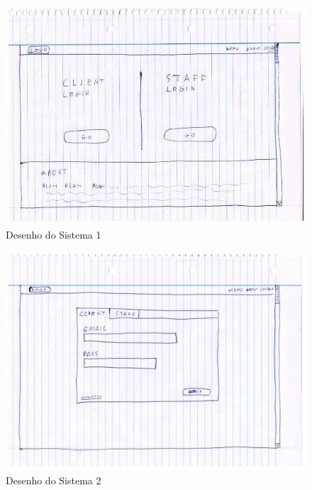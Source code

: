 \begin{figure}[!hbt]
    \centering
    \includegraphics[width=14cm]{Resources/Previous/image-090.jpg}
    \caption{Desenho do Sistema 1}
    
\end{figure}
\FloatBarrier
\begin{figure}[!hbt]
    \centering
    \includegraphics[width=14cm]{Resources/Previous/image-091.jpg}
    \caption{Desenho do Sistema 2}
    
\end{figure}
\FloatBarrier
